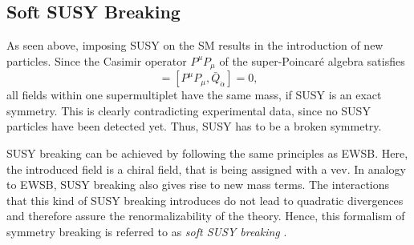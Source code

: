 \documentclass[a4paper,12pt]{book}
\begin{document}
\subsection{Soft SUSY Breaking}
As seen above, imposing SUSY on the SM results in the introduction of new particles. Since the Casimir operator $P^\mu P_\mu$ of the super-Poincaré algebra satisfies
\begin{equation}
[P^\mu P_\mu, Q_\alpha] = [P^\mu P_\mu, \bar{Q}_{\dot{\alpha}}]=0,
\end{equation}
all fields within one supermultiplet have the same mass, if SUSY is an exact symmetry. This is clearly contradicting experimental data, since no SUSY particles have been detected yet. Thus, SUSY has to be a broken symmetry.\par
SUSY breaking can be achieved by following the same principles as EWSB. Here, the introduced field is a chiral field, that is being assigned with a vev. In analogy to EWSB, SUSY breaking also gives rise to new mass terms. The interactions that this kind of SUSY breaking introduces do not lead to quadratic divergences and therefore assure the renormalizability of the theory. Hence, this formalism of symmetry breaking is referred to as \textit{soft SUSY breaking} \cite{martinSUSY}. 
\end{document}
